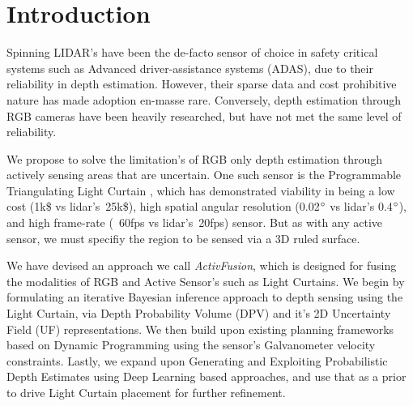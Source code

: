 \documentclass[review]{cvpr}
\begin{document}
\fi


\section{Introduction}

Spinning LIDAR's have been the de-facto sensor of choice in safety critical systems such as Advanced driver-assistance systems (ADAS), due to their reliability in depth estimation. However, their sparse data and cost prohibitive nature has made adoption en-masse rare. Conversely, depth estimation through RGB cameras have been heavily researched, but have not met the same level of reliability. 

We propose to solve the limitation's of RGB only depth estimation through actively sensing areas that are uncertain. One such sensor is the Programmable Triangulating Light Curtain \cite{bartels2019Agile}, which has demonstrated viability in being a low cost (1k\$ vs lidar's~25k\$), high spatial angular resolution (0.02$\degree$ vs lidar's  0.4$\degree$), and high frame-rate (~60fps vs lidar's~20fps) sensor. But as with any active sensor, we must specifiy the region to be sensed via a 3D ruled surface.

We have devised an approach we call \textit{ActivFusion}, which is designed for fusing the modalities of RGB and Active Sensor's such as Light Curtains. We begin by formulating an iterative Bayesian inference approach to depth sensing using the Light Curtain, via Depth Probability Volume (DPV) and it's 2D Uncertainty Field (UF) representations. We then build upon existing planning frameworks based on Dynamic Programming using the sensor's Galvanometer velocity constraints. Lastly, we expand upon Generating and Exploiting Probabilistic Depth Estimates using Deep Learning based approaches, and use that as a prior to drive Light Curtain placement for further refinement.





  

{\small


}
\end{document}
